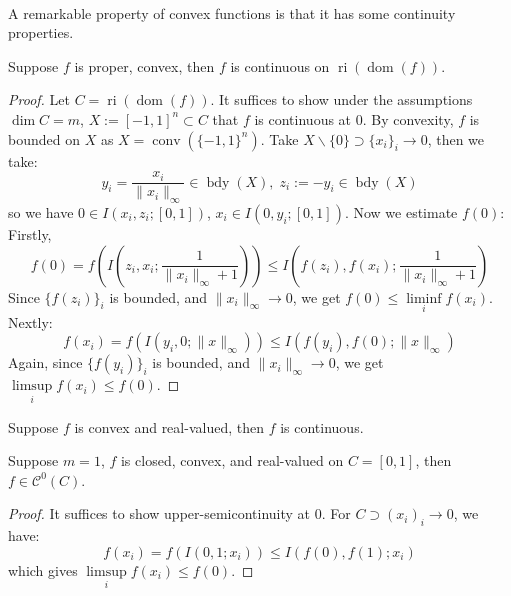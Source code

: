 \paragraph{}A remarkable property of convex functions is that it has some continuity properties.

\begin{prop}
	\label{prop:022-continuity}
	Suppose $f$ is proper, convex, then $f$ is continuous on $\operatorname{ri}(\operatorname{dom}(f))$.
\end{prop}

\begin{proof}
	Let $C=\operatorname{ri}(\operatorname{dom}(f))$. It suffices to show under the assumptions $\dim C=m$, $X:=[-1,1]^n\subset C$ that $f$ is continuous at $0$. By convexity, $f$ is bounded on $X$ as $X=\operatorname{conv}(\{-1,1\}^n)$. Take $X\smallsetminus\{0\}\supset \{x_i\}_i\to 0$, then we take:
	\[
		y_i=\frac{x_i}{\|x_i\|_\infty}\in \operatorname{bdy}(X),\;
		z_i:=-y_i\in \operatorname{bdy}(X)
	\]
	so we have $0\in I(x_i,z_i;[0,1])$, $x_i\in I(0,y_i;[0,1])$. Now we estimate $f(0)$: Firstly,
	\[
		f(0)=f\left(I\left(z_i,x_i;\frac{1}{\|x_i\|_\infty+1}\right)\right)\leq I\left(f(z_i),f(x_i);\frac{1}{\|x_i\|_\infty+1}\right)
	\]
	Since $\{f(z_i)\}_i$ is bounded, and $\|x_i\|_\infty\to0$, we get $f(0)\leq \underset{i}{\operatorname{liminf}}f(x_i)$. Nextly:
	\[
		f(x_i)=f(I(y_i, 0;\|x\|_\infty))\leq I(f(y_i),f(0);\|x\|_\infty)
	\]
	Again, since $\{f(y_i)\}_i$ is bounded, and $\|x_i\|_\infty\to0$, we get $\underset{i}{\operatorname{limsup}}f(x_i)\leq f(0)$.
\end{proof}

\begin{coro}
	\label{coro:022-continuity-real-valued}
	Suppose $f$ is convex and real-valued, then $f$ is continuous.
\end{coro}

\begin{coro}
	\label{coro:022-line-continuity}
	Suppose $m=1$, $f$ is closed, convex, and real-valued on $C=[0,1]$, then $f\in \mathscr{C}^0(C)$.
\end{coro}

\begin{proof}
	It suffices to show upper-semicontinuity at $0$. For $C\supset (x_i)_i\to 0$, we have:
	\[
		f(x_i)=f(I(0,1;x_i))\leq I(f(0),f(1); x_i)
	\]
	which gives $\underset{i}{\operatorname{limsup}}f(x_i)\leq f(0)$.
\end{proof}

